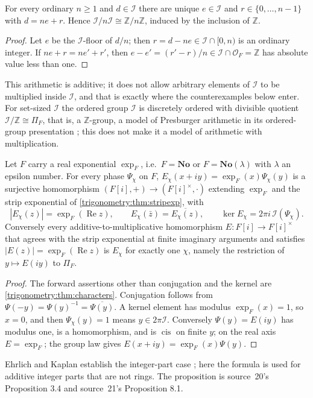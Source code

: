 \documentclass[11pt,letterpaper]{article}
\numberwithin{equation}{section}
\theoremstyle{definition}
\theoremstyle{remark}
\newcommand{\No}{\mathbf{No}}
\newcommand{\Z}{\mathbb Z}
\newcommand{\OO}{\mathcal O}
\newcommand{\re}{\operatorname{Re}}
\newcommand{\cis}{\operatorname{cis}}
\newcommand{\cI}{\mathcal I}
\begin{document}
\begin{proposition}\label{trigonometry:per:prop:division}
For every ordinary $n\ge1$ and $d\in\cI$ there are unique $e\in\cI$ and $r\in\{0,\dots,n-1\}$ with
$d=ne+r$. Hence $\cI/n\cI\cong\Z/n\Z$, induced by the inclusion of $\Z$.
\end{proposition}
\begin{proof}
Let $e$ be the $\cI$-floor of $d/n$; then $r=d-ne\in\cI\cap[0,n)$ is an ordinary integer. If
$ne+r=ne'+r'$, then $e-e'=(r'-r)/n\in\cI\cap\OO_F=\Z$ has absolute value less than one.
\end{proof}
This arithmetic is additive; it does not allow arbitrary elements of $\cI$ to be multiplied inside
$\cI$, and that is exactly where the counterexamples below enter. For set-sized $\cI$ the ordered
group $\cI$ is discretely ordered with divisible quotient $\cI/\Z\cong\Pi_F$, that is, a $\Z$-group, a
model of Presburger arithmetic in its ordered-group presentation \cite[\S2]{Jerabek}; this does not make
it a model of arithmetic with multiplication.

\begin{proposition}\label{trigonometry:per:prop:exponentials}
Let $F$ carry a real exponential $\exp_F$, i.e.\ $F=\No$ or $F=\No(\lambda)$ with $\lambda$ an epsilon
number. For every phase $\Psi_\chi$ on $F$, $E_\chi(x+iy)=\exp_F(x)\Psi_\chi(y)$ is a surjective
homomorphism $(F[i],+)\to(F[i]^\times,\cdot)$ extending $\exp_F$ and the strip exponential of
\cref{trigonometry:thm:stripexp}, with
\begin{equation}\label{trigonometry:per:eq:explaws}
 |E_\chi(z)|=\exp_F(\re z),\qquad E_\chi(\bar z)=\overline{E_\chi(z)},\qquad
 \ker E_\chi=2\pi i\,\cI(\Psi_\chi).
\end{equation}
Conversely every additive-to-multiplicative homomorphism $E:F[i]\to F[i]^\times$ that agrees with the
strip exponential at finite imaginary arguments and satisfies $|E(z)|=\exp_F(\re z)$ is $E_\chi$ for
exactly one $\chi$, namely the restriction of $y\mapsto E(iy)$ to $\Pi_F$.
\end{proposition}
\begin{proof}
The forward assertions other than conjugation and the kernel are \cref{trigonometry:thm:characters}.
Conjugation follows from $\Psi(-y)=\Psi(y)^{-1}=\overline{\Psi(y)}$. A kernel element has modulus
$\exp_F(x)=1$, so $x=0$, and then $\Psi_\chi(y)=1$ means $y\in2\pi\cI$. Conversely $\Psi(y)=E(iy)$
has modulus one, is a homomorphism, and is $\cis$ on finite $y$; on the real axis $E=\exp_F$; the
group law gives $E(x+iy)=\exp_F(x)\Psi(y)$.
\end{proof}
Ehrlich and Kaplan establish the integer-part case \cite[Proposition 11.2]{EK}; here the formula is
used for additive integer parts that are not rings. The proposition is source~20's Proposition 3.4
and source~21's Proposition 8.1.
\end{document}
